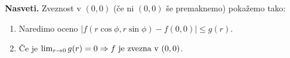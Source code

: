 \textbf{Nasveti.}
Zveznost v $(0,0)$ (če ni $(0,0)$ še premaknemo) pokažemo tako:
\begin{enumerate}
    \item Naredimo oceno $|f(r \cos \phi, r \sin \phi) - f(0,0)| \leq g(r).$
    \item Če je $\lim_{r \to 0} g(r) = 0 \Rightarrow f \text{ je zvezna v } (0,0)$.
\end{enumerate}
